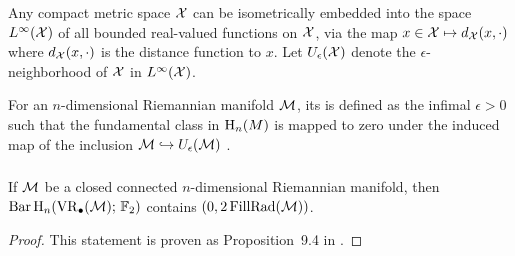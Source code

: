Any compact metric space $\mathcal{X}$ can be isometrically embedded into the space $L^\infty(\mathcal{X})$ of all bounded real-valued functions on $\mathcal{X}$, via the map $x \in \mathcal{X} \mapsto d_{\mathcal{X}}(x,\cdot)$ where $d_{\mathcal{X}}(x,\cdot)$ is the distance function to $x$.
Let $U_\epsilon(\mathcal{X})$ denote the $\epsilon$-neighborhood of $\mathcal{X}$ in $L^\infty(\mathcal{X})$.

For an $n$-dimensional Riemannian manifold $\mathcal{M}$, its  is defined as the infimal $\epsilon > 0$ such that the fundamental class in $\operatorname{H}_n(M)$ is mapped to zero under the induced map of the inclusion $\mathcal{M} \hookrightarrow U_\epsilon(\mathcal{M})$ \cite[page 108]{gromov2007metric}.

\subsubsection{}\label{prop:manifold}

\proposition If $\mathcal{M}$ be a closed connected $n$-dimensional Riemannian manifold, then \(\operatorname{Bar} \operatorname{H}_{n}(\operatorname{VR}_\bullet(\mathcal{M});\,{\mathbb{F}_2})\) contains \((0,2\operatorname{FillRad}(\mathcal{M}))\).
\begin{proof}
	This statement is proven as Proposition~9.4 in \cite{lim2020vietoris}.
\end{proof}